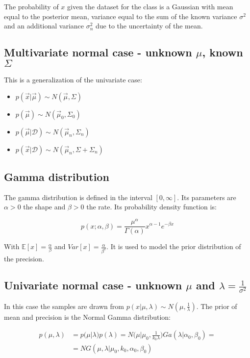 		The probability of $x$ given the dataset for the class is a Gaussian with mean equal to the posterior mean, variance equal to the sum of the known variance $\sigma^2$ and an additional variance $\sigma^2_n$ due to the uncertainty of the mean.

	\subsection{Multivariate normal case - unknown $\mu$, known $\Sigma$}
	This is a generalization of the univariate case:

	\begin{multicols}{2}
		\begin{itemize}
			\item $p(\vec{x}|\vec{\mu}) \sim N(\vec{\mu}, \Sigma)$
			\item $p(\vec{\mu})\sim N(\vec{\mu}_0, \Sigma_0)$
			\item $p(\vec{\mu}|\mathcal{D}) \sim N(\vec{\mu}_n, \Sigma_n)$
			\item $p(\vec{x}|\mathcal{D}) \sim N(\vec{\mu}_n, \Sigma+\Sigma_n)$
		\end{itemize}
	\end{multicols}

	\subsection{Gamma distribution}
	The gamma distribution is defined in the interval $[0, \infty]$.
	Its parameters are $\alpha>0$ the shape and $\beta>0$ the rate.
	Its probability density function is:

	$$p(x;\alpha, \beta) = \frac{\mu^\alpha}{\Gamma(\alpha)}x^{\alpha-1}e^{-\beta x}$$

	With $\mathbb{E}[x] = \frac{\alpha}{\beta}$ and $Var[x] = \frac{\alpha}{\beta^2}$.
	It is used to model the prior distribution of the precision.

	\subsection{Univariate normal case - unknown $\mu$ and $\lambda = \frac{1}{\sigma^2}$}
	In this case the samples are drawn from $p(x|\mu, \lambda)\sim N(\mu, \frac{1}{\lambda})$.
	The prior of mean and precision is the Normal Gamma distribution:

	\begin{align*}
		p(\mu, \lambda) &=p(\mu|\lambda)p(\lambda) = N\biggl(\mu|\mu_0, \frac{1}{k_0 \lambda}\biggr)Ga(\lambda|\alpha_0, \beta_0)=\\
										&=NG(\mu, \lambda|\mu_0, k_0, \alpha_0, \beta_0)
	\end{align*}

